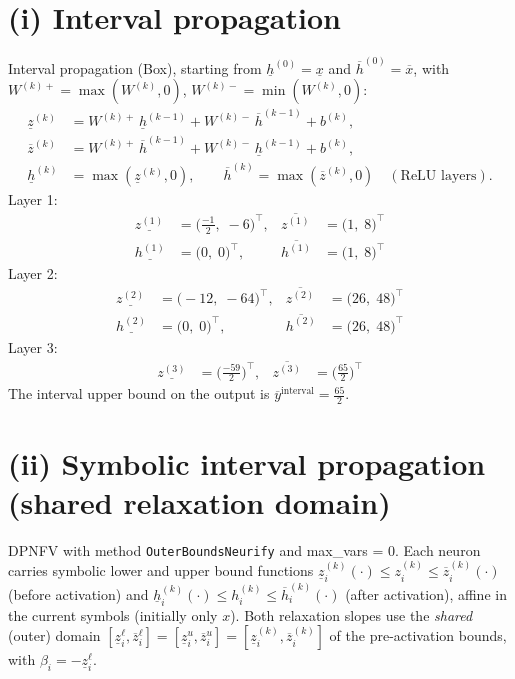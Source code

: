 \documentclass[11pt]{article}
\begin{document}
\section{(i) Interval propagation}
Interval propagation (Box), starting from $\underline{h}^{(0)} = \underline{x}$ and
$\overline{h}^{(0)} = \overline{x}$, with $W^{(k)+} = \max(W^{(k)}, 0)$,
$W^{(k)-} = \min(W^{(k)}, 0)$:
\begin{align*}
\underline{z}^{(k)} &= W^{(k)+}\, \underline{h}^{(k-1)} + W^{(k)-}\, \overline{h}^{(k-1)} + b^{(k)}, \\ 
\overline{z}^{(k)} &= W^{(k)+}\, \overline{h}^{(k-1)} + W^{(k)-}\, \underline{h}^{(k-1)} + b^{(k)}, \\ 
\underline{h}^{(k)} &= \max(\underline{z}^{(k)}, 0), \qquad \overline{h}^{(k)} = \max(\overline{z}^{(k)}, 0) \quad (\text{ReLU layers}).
\end{align*}
Layer 1:
\begin{align*}
\underline{z^{(1)}} &= \bigl(\frac{-1}{2},\; -6\bigr)^{\!\top}, & \overline{z^{(1)}} &= \bigl(1,\; 8\bigr)^{\!\top}
 \\
\underline{h^{(1)}} &= \bigl(0,\; 0\bigr)^{\!\top}, & \overline{h^{(1)}} &= \bigl(1,\; 8\bigr)^{\!\top}
\end{align*}
Layer 2:
\begin{align*}
\underline{z^{(2)}} &= \bigl(-12,\; -64\bigr)^{\!\top}, & \overline{z^{(2)}} &= \bigl(26,\; 48\bigr)^{\!\top}
 \\
\underline{h^{(2)}} &= \bigl(0,\; 0\bigr)^{\!\top}, & \overline{h^{(2)}} &= \bigl(26,\; 48\bigr)^{\!\top}
\end{align*}
Layer 3:
\begin{align*}
\underline{z^{(3)}} &= \bigl(\frac{-59}{2}\bigr)^{\!\top}, & \overline{z^{(3)}} &= \bigl(\frac{65}{2}\bigr)^{\!\top}
\end{align*}
The interval upper bound on the output is $\overline{y}^{\text{interval}} = \frac{65}{2}$.

\section{(ii) Symbolic interval propagation (shared relaxation domain)}
DPNFV with method \texttt{OuterBoundsNeurify} and max\_vars = 0. Each neuron carries symbolic lower and upper bound functions
$\underline{z}^{(k)}_i(\cdot) \le z^{(k)}_i \le \overline{z}^{(k)}_i(\cdot)$ (before activation)
and $\underline{h}^{(k)}_i(\cdot) \le h^{(k)}_i \le \overline{h}^{(k)}_i(\cdot)$ (after activation),
affine in the current symbols (initially only $x$).
Both relaxation slopes use the \emph{shared} (outer) domain
$[\underline{z}^{\ell}_i, \overline{z}^{\ell}_i] = [\underline{z}^{u}_i, \overline{z}^{u}_i] = [\underline{z}^{(k)}_i, \overline{z}^{(k)}_i]$
of the pre-activation bounds, with $\beta_i = -\underline{z}^{\ell}_i$.
\end{document}

